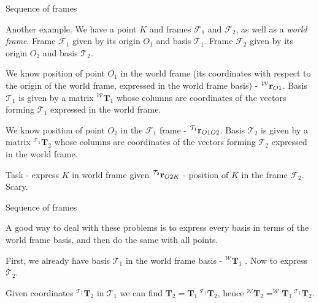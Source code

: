 \documentclass{beamer}
\begin{document}
\begin{frame}{Sequence of frames}
	\begin{flushleft}
		
		Another example. We have a point $K$ and frames $\mathcal F_1$ and $\mathcal F_2$, as well as a \emph{world frame}. Frame $\mathcal F_1$ given by its origin $O_1$ and basis $\mathcal T_1$. Frame $\mathcal F_2$ given by its origin $O_2$ and basis $\mathcal T_2$. 
		
		\bigskip
		
		We know position of point $O_1$ in the world frame (its coordinates with respect to the origin of the world frame, expressed in the world frame basis) - $^{\mathcal W}\mathbf{r}_{O1}$. Basis $\mathcal T_1$ is given by a matrix $^{\mathcal W}\mathbf T_1$ whose columns are coordinates of the vectors forming $\mathcal T_1$ expressed in the world frame.
		
		\bigskip
		
		We know position of point $O_2$ in the $\mathcal F_1$ frame - $^{\mathcal T_1}\mathbf{r}_{O1O2}$. Basis $\mathcal T_2$ is given by a matrix $^{\mathcal T_1}\mathbf T_2$ whose columns are coordinates of the vectors forming $\mathcal T_2$ expressed in the world frame.
		
		\bigskip
		
		Task - express $K$ in world frame given $^{\mathcal T_2}\mathbf{r}_{O2K}$ - position of $K$ in the frame $\mathcal F_2$. Scary.
		
	\end{flushleft}
\end{frame}


\begin{frame}{Sequence of frames}
	\begin{flushleft}
		
		A good way to deal with these problems is to express every basis in terms of the world frame basis, and then do the same with all points.
		
		\bigskip
		
		First, we already have basis $\mathcal T_1$ in the world frame basis - $^{\mathcal W}\mathbf T_1$ . Now to express $\mathcal T_2$.
		
		\bigskip
		
		Given coordinates $^{\mathcal T_1}\mathbf T_2$ in $\mathcal T_1$ we can find $\mathbf T_2 = \mathbf T_1 \ ^{\mathcal T_1}\mathbf T_2$, hence 
		$^{\mathcal W}\mathbf T_2 = ^{\mathcal W}\mathbf T_1 \ ^{\mathcal T_1}\mathbf T_2$.
		
	\end{flushleft}
\end{frame}
\end{document}
